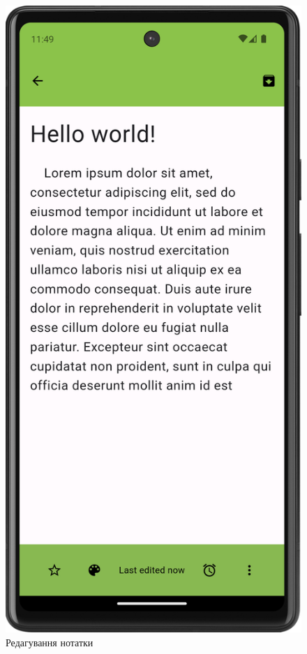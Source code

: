 \documentclass[oneside,14pt]{extarticle}
\begin{document}
\begin{normalsize}
	\begin{figure}[H]
		\begin{minipage}{0.48\textwidth}
			\centering
			\includegraphics[scale=0.12]{3}
			\caption{Редагування нотатки}

\end{minipage}
\end{figure}
\end{normalsize}
\end{document}

